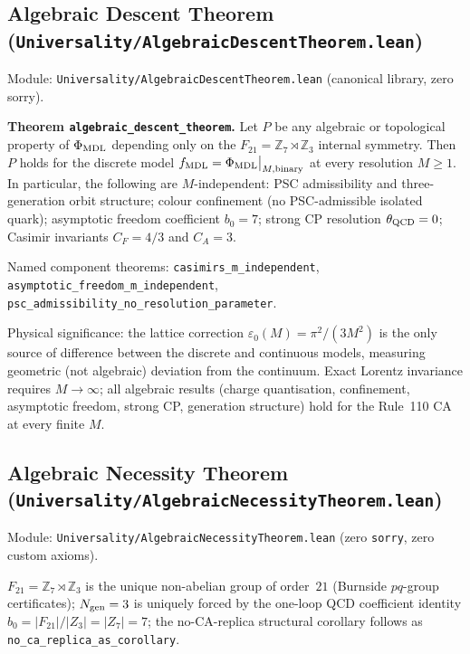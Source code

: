 \documentclass[11pt,a4paper]{article}
\newenvironment{keybox}[1]{%
  \Needspace*{8\baselineskip}%
  \begin{tcolorbox}[
    enhanced,
    breakable=false,
    colback=blue!5,
    colframe=blue!45!black,
    coltitle=black,
    colbacktitle=blue!14,
    boxrule=0.85pt,
    arc=2.5pt,
    left=9pt, right=9pt, top=6pt, bottom=6pt,
    titlerule=0.55pt,
    fonttitle=\bfseries,
    title={#1},
    before upper=\raggedright,
    before skip=0.9\baselineskip,
    after skip=0.9\baselineskip
  ]%
}{%
  \end{tcolorbox}%
}
\theoremstyle{definition}
\begin{document}
\subsection{Algebraic Descent Theorem
  (\texttt{Universality/\allowbreak AlgebraicDescentTheorem.lean})}\label{subsec:algebraic-descent}

Module: \texttt{Universality/AlgebraicDescentTheorem.lean} (canonical library, zero sorry).

\begin{keybox}{Algebraic Descent}
\textbf{Theorem \lstinline|algebraic_descent_theorem|.}
Let $P$ be any algebraic or topological property of $\Phi_{\rm MDL}$
depending only on the $F_{21} = \mathbb{Z}_7 \rtimes \mathbb{Z}_3$ internal
symmetry.  Then $P$ holds for the discrete model
$f_{\rm MDL} = \Phi_{\rm MDL}\big|_{M,\rm binary}$ at every resolution
$M \ge 1$.
In particular, the following are $M$-independent:
PSC admissibility and three-generation orbit structure;
colour confinement (no PSC-admissible isolated quark);
asymptotic freedom coefficient $b_0 = 7$;
strong CP resolution $\theta_{\rm QCD} = 0$;
Casimir invariants $C_F = 4/3$ and $C_A = 3$.
\end{keybox}

Named component theorems: \lstinline|casimirs_m_independent|,
\lstinline|asymptotic_freedom_m_independent|,
\lstinline|psc_admissibility_no_resolution_parameter|.

Physical significance: the lattice correction
$\varepsilon_0(M) = \pi^2/(3M^2)$ is the only source of difference between
the discrete and continuous models, measuring geometric (not algebraic)
deviation from the continuum.  Exact Lorentz invariance requires $M \to \infty$;
all algebraic results (charge quantisation, confinement, asymptotic freedom,
strong CP, generation structure) hold for the Rule~110 CA at every finite $M$.

\subsection{Algebraic Necessity Theorem
  (\texttt{Universality/\allowbreak AlgebraicNecessityTheorem.lean})}\label{subsec:algebraic-necessity}

Module: \texttt{Universality/AlgebraicNecessityTheorem.lean} (zero
\lstinline|sorry|, zero custom axioms).

\begin{keybox}{\lstinline|algebraic_necessity_theorem| (zero \texttt{sorry})}
$F_{21} = \mathbb{Z}_7 \rtimes \mathbb{Z}_3$ is the unique non-abelian group of
order~$21$ (Burnside $pq$-group certificates); $N_{\rm gen} = 3$ is uniquely
forced by the one-loop QCD coefficient identity $b_0 = |F_{21}|/|Z_3| = |Z_7| = 7$;
the no-CA-replica structural corollary follows as
\lstinline|no_ca_replica_as_corollary|.
\end{keybox}
\end{document}
